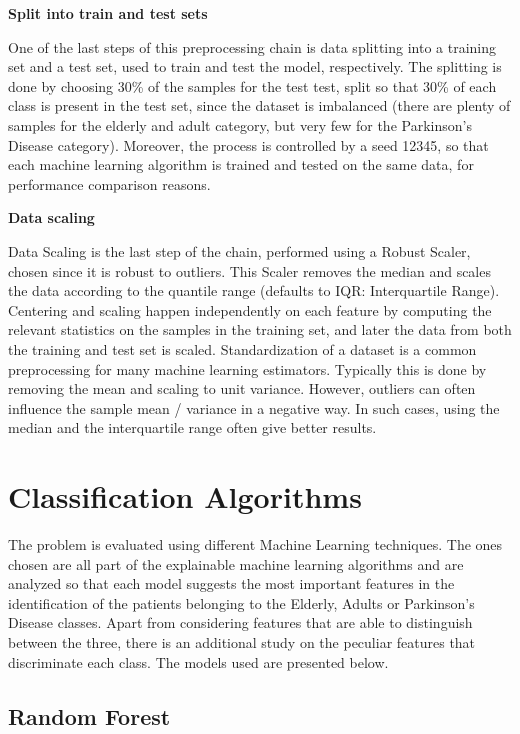 \textbf{Split into train and test sets}

One of the last steps of this preprocessing chain is data splitting into a training set and a test set, used to train and test the model, respectively.
The splitting is done by choosing 30\% of the samples for the test test, split so that 30\% of each class is present in the test set, since the dataset is imbalanced (there are plenty of samples for the elderly and adult category, but very few for the Parkinson's Disease category). Moreover, the process is controlled by a seed 12345, so that each machine learning algorithm is trained and tested on the same data, for performance comparison reasons. 

\textbf{Data scaling}

Data Scaling is the last step of the chain, performed using a Robust Scaler, chosen since it is robust to outliers. This Scaler removes the median and scales the data according to the quantile range (defaults to IQR: Interquartile Range).
Centering and scaling happen independently on each feature by computing the relevant statistics on the samples in the training set, and later the data from both the training and test set is scaled. 
Standardization of a dataset is a common preprocessing for many machine learning estimators. Typically this is done by removing the mean and scaling to unit variance. However, outliers can often influence the sample mean / variance in a negative way. In such cases, using the median and the interquartile range often give better results. 



\section{Classification Algorithms}

The problem is evaluated using different Machine Learning techniques. The ones chosen are all part of the explainable machine learning algorithms and 
are analyzed so that each model suggests the most important features in the identification of the patients belonging to the Elderly, Adults or Parkinson's Disease classes.
Apart from considering features that are able to distinguish between the three, there is an additional study on the peculiar features that discriminate each class.
The models used are presented below.

\subsection{Random Forest}

